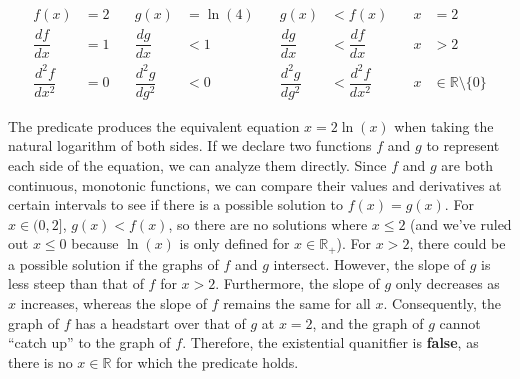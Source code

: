 \documentclass[letterpaper, 12pt]{article}
\begin{document}
\begin{enumerate}
\begin{enumerate}
\begin{align*}
    f(x) &= 2 &\quad g(x) &= \ln(4) &\quad g(x) &< f(x) &\quad x &= 2 \\
    \dfrac{df}{dx} &= 1 &\quad \dfrac{dg}{dx} &< 1 
    &\quad \dfrac{dg}{dx} &< \dfrac{df}{dx} 
    &\quad x &> 2 \\
    \dfrac{d^2f}{dx^2} &= 0 &\quad \dfrac{d^2g}{dg^2} &< 0 
    &\quad \dfrac{d^2g}{dg^2} &< \dfrac{d^2f}{dx^2} 
    &\quad x &\in \mathbb{R} \setminus \{0\}
\end{align*}
\begin{flushleft}
    The predicate produces the equivalent equation $x = 2\ln(x)$ when taking the natural 
    logarithm of both sides. If we declare two functions $f$ and $g$ to represent each side 
    of the equation, we can analyze them directly. Since $f$ and $g$ are both continuous, 
    monotonic functions, we can compare their values and derivatives at certain intervals to 
    see if there is a possible solution to $f(x) = g(x)$. For $x \in (0, 2]$, $g(x) < f(x)$, 
    so there are no solutions where $x \le 2$ (and we've ruled out $x \le 0$ because $\ln(x)$ 
    is only defined for $x \in \mathbb{R}_+$). For $x > 2$, there could be a possible solution 
    if the graphs of $f$ and $g$ intersect. However, the slope of $g$ is less steep than that 
    of $f$ for $x > 2$. Furthermore, the slope of $g$ only decreases as $x$ increases, whereas 
    the slope of $f$ remains the same for all $x$. Consequently, the graph of $f$ has a headstart 
    over that of $g$ at $x = 2$, and the graph of $g$ cannot ``catch up'' to the graph of $f$. 
    Therefore, the existential quanitfier is \textbf{false}, as there is no $x \in \mathbb{R}$ 
    for which the predicate holds.
\end{flushleft}
\end{enumerate}
\end{enumerate}
\end{document}
